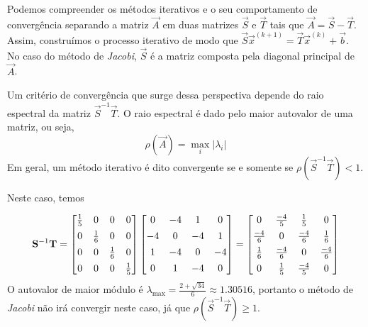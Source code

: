 \documentclass{homework}
\begin{document}
		
		Podemos compreender os métodos iterativos e o seu comportamento de convergência separando a matriz $\vec{A}$ em duas matrizes $\vec{S}$ e $\vec{T}$ tais que $\vec{A} = \vec{S} - \vec{T}$. Assim, construímos o processo iterativo de modo que $\vec{S} \vec{x}^{(k+1)} = \vec{T}\vec{x}^{(k)} + \vec{b}$. No caso do método de \textit{Jacobi}, $\vec{S}$ é a matriz composta pela diagonal principal de $\vec{A}$.\par
		
		Um critério de convergência que surge dessa perspectiva depende do raio espectral da matriz $\vec{S}^{-1}\vec{T}$. O raio espectral é dado pelo maior autovalor de uma matriz, ou seja,
			$$\rho\left(\vec{A}\right) = \max_{i} |\lambda_i|$$
		Em geral, um método iterativo é dito convergente se e somente se $\rho\left(\vec{S}^{-1}\vec{T}\right) < 1$.\par
		
		Neste caso, temos
		
		$$\vec{S}^{-1}\vec{T} = \left[\begin{array}{@{}cccc@{}}
		\frac{1}{5} &0 &0 &0\\[1ex]
		0 & \frac{1}{6} & 0 &0\\[1ex]
		0 & 0 & \frac{1}{6} &0\\[1ex]
		0 &0 &0 &\frac{1}{5}
		\end{array}\right]\left[\begin{array}{@{}cccc@{}}
		0 & -4 &  1 &  0 \\[1ex]
		-4 &  0 & -4 &  1 \\[1ex]
		1 & -4 &  0 & -4 \\[1ex]
		0 &  1 & -4 &  0
		\end{array}\right] = \left[\begin{array}{@{}cccc@{}}
		0& \frac{-4}{5} & \frac{ 1}{5} & 0 \\[1ex]
		\frac{-4}{6} & 0 & \frac{-4}{6} & \frac{ 1}{6} \\[1ex]
		\frac{1 }{6}& \frac{-4}{6} & 0 & \frac{-4}{6} \\[1ex]
		0& \frac{ 1}{5} & \frac{-4}{5} & 0
		\end{array}\right]
		$$
		O autovalor de maior módulo é $\lambda_{\max} = \frac{2 + \sqrt{34}}{6} \approx 1.30516$, portanto o método de \textit{Jacobi} não irá convergir neste caso, já que $\rho\left(\vec{S}^{-1}\vec{T}\right) \ge 1$.
		
		
		
\end{document}
